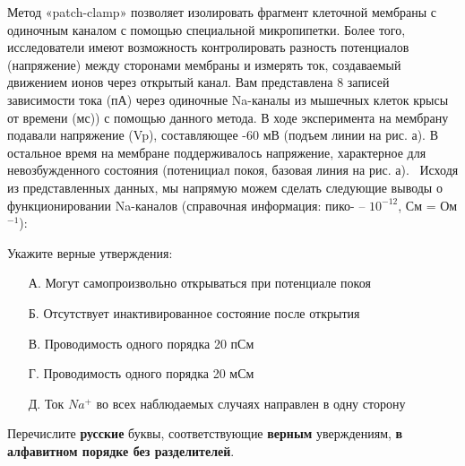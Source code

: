 
Метод «patch-clamp» позволяет изолировать фрагмент клеточной мембраны с одиночным каналом с помощью специальной микропипетки. Более того, исследователи имеют возможность контролировать разность потенциалов (напряжение) между сторонами мембраны и измерять ток, создаваемый движением ионов через открытый канал. Вам представлена 8 записей зависимости тока (пА) через одиночные Na-каналы из мышечных клеток крысы от времени (мс)) с помощью данного метода. В ходе эксперимента на мембрану подавали напряжение (Vp), составляющее -60 мВ (подъем линии на рис. а). В остальное время на мембране поддерживалось напряжение, характерное для невозбужденного состояния (потенициал покоя, базовая линия на рис. а).  Исходя из представленных данных, мы напрямую можем сделать следующие выводы о функционировании Na-каналов (справочная информация: пико- – $10^{-12}$, См = Ом$^{-1}$):


Укажите верные утверждения:
\begin{enumerate}
    \item[А.] Могут самопроизвольно открываться при потенциале покоя
    \item[Б.] Отсутствует инактивированное состояние после открытия
    \item[В.] Проводимость одного порядка 20 пСм
    \item[Г.] Проводимость одного порядка 20 мСм
    \item[Д.] Ток $Na^+$ во всех наблюдаемых случаях направлен в одну сторону
\end{enumerate}

Перечислите \textbf{русские} буквы, соответствующие \textbf{верным} уверждениям, \textbf{в алфавитном порядке без разделителей}.

